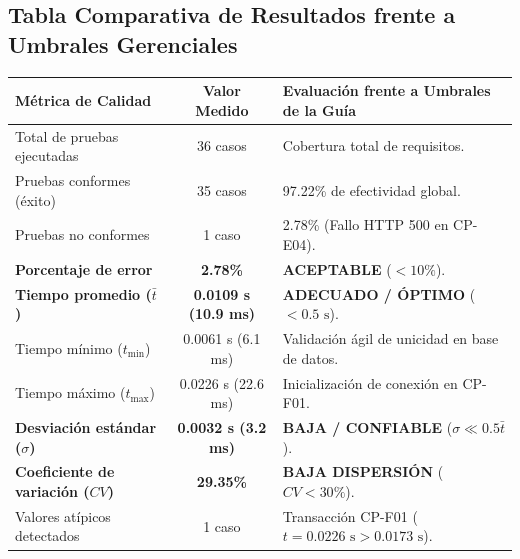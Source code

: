\documentclass{article}
\begin{document}
\subsection{Tabla Comparativa de Resultados frente a Umbrales Gerenciales}
\begin{center}
\begin{tabular}{|l|c|l|}
\hline
\textbf{Métrica de Calidad} & \textbf{Valor Medido} & \textbf{Evaluación frente a Umbrales de la Guía}\\ \hline
Total de pruebas ejecutadas & 36 casos & Cobertura total de requisitos.\\
Pruebas conformes (éxito) & 35 casos & 97.22\% de efectividad global.\\
Pruebas no conformes & 1 caso & 2.78\% (Fallo HTTP 500 en CP-E04).\\ \hline
\textbf{Porcentaje de error} & \textbf{2.78\%} & \textbf{ACEPTABLE} ($< 10\%$).\\ \hline
\textbf{Tiempo promedio ($\bar{t}$)} & \textbf{0.0109 s (10.9 ms)} & \textbf{ADECUADO / ÓPTIMO} ($< 0.5\text{ s}$).\\ \hline
Tiempo mínimo ($t_{\min}$) & 0.0061 s (6.1 ms) & Validación ágil de unicidad en base de datos.\\ \hline
Tiempo máximo ($t_{\max}$) & 0.0226 s (22.6 ms) & Inicialización de conexión en CP-F01.\\ \hline
\textbf{Desviación estándar ($\sigma$)} & \textbf{0.0032 s (3.2 ms)} & \textbf{BAJA / CONFIABLE} ($\sigma \ll 0.5\bar{t}$).\\ \hline
\textbf{Coeficiente de variación ($CV$)} & \textbf{29.35\%} & \textbf{BAJA DISPERSIÓN} ($CV < 30\%$).\\ \hline
Valores atípicos detectados & 1 caso & Transacción CP-F01 ($t = 0.0226\text{ s} > 0.0173\text{ s}$).\\
\hline
\end{tabular}
\end{center}
\end{document}
